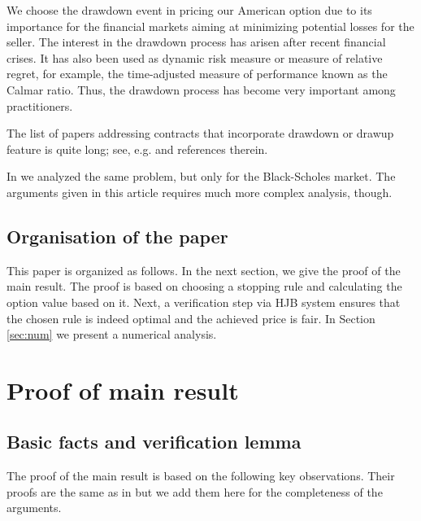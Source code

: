 \documentclass[10pt,a4paper]{amsart}
\begin{document}
	
	We choose the drawdown event in pricing our American option due to its importance for the financial markets aiming
	at minimizing potential losses for the seller.
	The interest in the drawdown process has arisen after recent financial crises. It has also been used as dynamic
risk measure or measure of relative regret, for example, the time-adjusted measure of performance known as the Calmar
ratio. Thus, the drawdown process has become very
	important among practitioners.
	
	The list of papers addressing contracts that incorporate drawdown or drawup feature is quite long; see,
	e.g. \cite{CZH, GZ, MA, ZP&JT2, ZP&JT, drawdownup2, PV, Sorn, Vec1,Vec2, drawdownup1, olympia}
	and references therein.
	
	In \cite{naszapraca} we analyzed the same problem, but only for the Black-Scholes market. The arguments given in this article requires much more complex analysis, though.
	
	
	\subsection{Organisation of the paper}
	This paper is organized as follows. In the next section, we give the proof of the main result. The proof is based on choosing a stopping rule and calculating the option value based on it. Next, a verification step via HJB system ensures that the chosen rule is indeed optimal and the achieved price is fair.
	In Section \ref{sec:num} we present a numerical analysis.
	
	
	
	\section{Proof of main result}
	\subsection{Basic facts and verification lemma}
	The proof of the main result is based on the following
	key observations.
	Their proofs are the same as in \cite{naszapraca} but we add them here for the completeness of the arguments.
	
\end{document}
